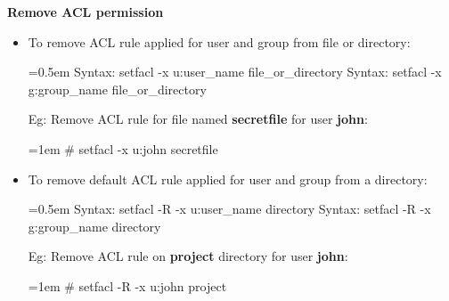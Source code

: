 \begin{flushleft}
\begin{itemize}
\textbf{Remove ACL permission}
\bigskip
\begin{itemize}
	\item To remove ACL rule applied for user and group from file or directory:
	\bigskip
	\begin{tcolorbox}[breakable,notitle,boxrule=-0pt,colback=pink,colframe=pink]
		\color{black}
		\font=0.5em
		Syntax: setfacl -x u:user\_name file\_or\_directory
		\newline
		Syntax: setfacl -x g:group\_name file\_or\_directory
		\font=4pt
	\end{tcolorbox}
	Eg: Remove ACL rule for file named \textbf{secretfile} for user \textbf{john}:
	\begin{tcolorbox}[breakable,notitle,boxrule=-0pt,colback=black,colframe=black]
		\color{green}
		\font=1em
		\# setfacl -x u:john secretfile
		\font=4pt
	\end{tcolorbox}
	\item To remove default ACL rule applied for user and group from a directory:
	\bigskip
	\begin{tcolorbox}[breakable,notitle,boxrule=-0pt,colback=pink,colframe=pink]
		\color{black}
		\font=0.5em
		Syntax: setfacl -R -x u:user\_name directory
		\newline
		Syntax: setfacl -R -x g:group\_name directory
		\font=4pt
	\end{tcolorbox}
	Eg: Remove ACL rule on \textbf{project} directory for user \textbf{john}:
	\bigskip
	\begin{tcolorbox}[breakable,notitle,boxrule=-0pt,colback=black,colframe=black]
		\color{green}
		\font=1em
		\# setfacl -R -x u:john project
		\font=4pt
	\end{tcolorbox}
	
	
\end{itemize}




\end{itemize}



	
\end{flushleft}

\newpage

